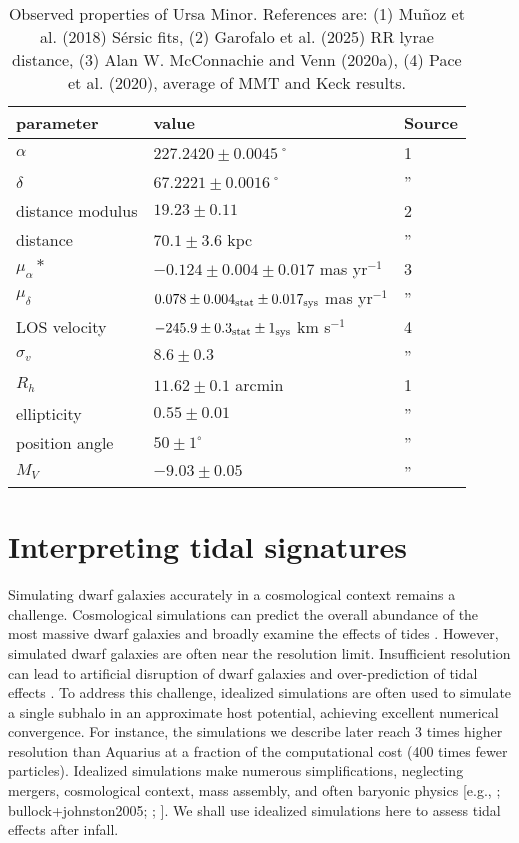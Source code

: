 \begin{table*}[t]
\centering
\caption[Observed Properties of Ursa Minor]{Observed properties of Ursa Minor. References are: (1) Muñoz et al. (2018) Sérsic fits, (2) Garofalo et al. (2025) RR lyrae distance, (3) Alan W. McConnachie and Venn (2020a), (4) Pace et al. (2020), average of MMT and Keck results. }
\label{tbl:umi_obs_props}
\begin{tabular}{lll}
\toprule
parameter & value & Source\\
\midrule
$\alpha$ & $ 227.2420 \pm 0.0045$˚ & 1\\
$\delta$ & $67.2221 \pm 0.0016$˚ & ”\\
distance modulus & $19.23 \pm 0.11$ & 2\\
distance & $70.1 \pm 3.6$ kpc & ”\\
$\mu_\alpha*$ & $-0.124 \pm 0.004 \pm 0.017$ mas yr$^{-1}$ & 3\\
$\mu_\delta$ & $0.078 \pm 0.004_{\rm stat} \pm 0.017_{\rm sys}$ mas yr$^{-1}$ & ”\\
LOS velocity & $-245.9 \pm 0.3_{\rm stat} \pm 1_{\rm sys}$ km s$^{-1}$ & 4\\
$\sigma_v$ & $8.6 \pm 0.3$ & ”\\
$R_h$ & $11.62 \pm 0.1$ arcmin & 1\\
ellipticity & $0.55 \pm 0.01$ & ”\\
position angle & $50 \pm 1^\circ$ & ”\\
$M_V$ & $-9.03 \pm 0.05$ & ”\\
\bottomrule
\end{tabular}
\end{table*}

\section{Interpreting tidal signatures}\label{sec:tidal_theory}

Simulating dwarf galaxies accurately in a cosmological context remains a
challenge. Cosmological simulations can predict the overall abundance of
the most massive dwarf galaxies \citep[e.g.,][]{sawala+2016} and broadly
examine the effects of tides \citep[e.g.,][]{riley+2024}. However,
simulated dwarf galaxies are often near the resolution limit.
Insufficient resolution can lead to artificial disruption of dwarf
galaxies and over-prediction of tidal effects
\citep[e.g.,][]{vandenbosch+2018, santos-santos+2025}. To address this
challenge, idealized simulations are often used to simulate a single
subhalo in an approximate host potential, achieving excellent numerical
convergence. For instance, the simulations we describe later reach 3
times higher resolution than Aquarius \citep{springel+2008} at a
fraction of the computational cost (400 times fewer particles).
Idealized simulations make numerous simplifications, neglecting mergers,
cosmological context, mass assembly, and often baryonic physics {[}e.g.,
\citet{hayashi+2003}; bullock+johnston2005; \citet{klimentowski+2009};
\citet{ogiya+2019}{]}. We shall use idealized simulations here to assess
tidal effects after infall.

